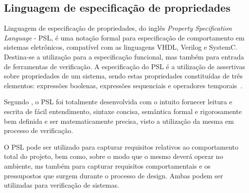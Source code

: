 \subsection{Linguagem de especificação de propriedades}
Linguagem de especificação de propriedades, do inglês \textit{Property Specification Language} - PSL, é uma notação formal para especificação de comportamento em sistemas eletrônicos, compatível com as linguagens VHDL\cite{IEEEVHDLLanguage}, Verilog\cite{IEEEVerilogLanguage} e SystemC\cite{IEEESystemCLanguage}. Destina-se a utilização para a especificação funcional, mas também para entrada de ferramentas de verificação. A especificação do PSL é a utilização de assertivas sobre propriedades de um sistema, sendo estas propriedades constituídas de três elementos: expressões boolenas, expressões sequenciais e operadores temporais~\cite{IEEEPSL}.

\par
Segundo \cite{IEEEPSL}, o PSL foi totalmente desenvolvida com o intuito fornecer leitura e escrita de fácil entendimento, sintaxe concisa, semântica formal e rigorosamente bem definida e ser matematicamente precisa, visto a utilização da mesma em processo de verificação. 

O PSL pode ser utilizado para capturar requisitos relativos ao comportamento total do projeto, bem como, sobre o modo que o mesmo deverá operar no ambiente, ms também para capturar requisitos comportamentais e os pressupostos que surgem durante o processo de design. Ambas podem ser utilizadas para verificação de sistemas. 

